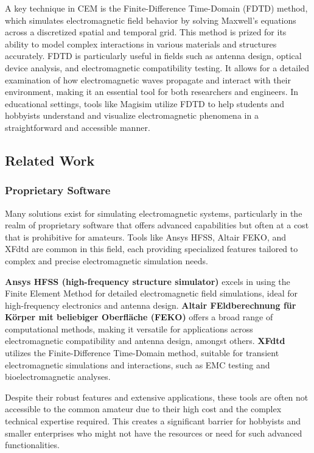 \documentclass[11pt, a4paper, titlepage]{article}
\begin{document}
A key technique in CEM is the Finite-Difference Time-Domain (FDTD) method, which simulates electromagnetic field behavior by solving Maxwell's equations across a discretized spatial and temporal grid. This method is prized for its ability to model complex interactions in various materials and structures accurately. FDTD is particularly useful in fields such as antenna design, optical device analysis, and electromagnetic compatibility testing. It allows for a detailed examination of how electromagnetic waves propagate and interact with their environment, making it an essential tool for both researchers and engineers. In educational settings, tools like Magisim utilize FDTD to help students and hobbyists understand and visualize electromagnetic phenomena in a straightforward and accessible manner.


\subsection{Related Work}
\subsubsection{Proprietary Software}
Many solutions exist for simulating electromagnetic systems, particularly in the realm of proprietary software that offers advanced capabilities but often at a cost that is prohibitive for amateurs. Tools like Ansys HFSS, Altair FEKO, and XFdtd are common in this field, each providing specialized features tailored to complex and precise electromagnetic simulation needs.

\textbf{Ansys HFSS (high-frequency structure simulator)} excels in using the Finite Element Method for detailed electromagnetic field simulations, ideal for high-frequency electronics and antenna design. \textbf{Altair FEldberechnung für Körper mit beliebiger Oberﬂäche (FEKO)} offers a broad range of computational methods, making it versatile for applications across electromagnetic compatibility and antenna design, amongst others. \textbf{XFdtd} utilizes the Finite-Difference Time-Domain method, suitable for transient electromagnetic simulations and interactions, such as EMC testing and bioelectromagnetic analyses.

Despite their robust features and extensive applications, these tools are often not accessible to the common amateur due to their high cost and the complex technical expertise required. This creates a significant barrier for hobbyists and smaller enterprises who might not have the resources or need for such advanced functionalities.
\newpage
\end{document}
